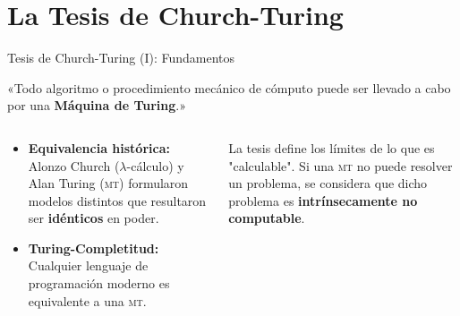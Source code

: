 \documentclass[aspectratio=1610, 12pt]{beamer}
\newcommand{\MT}{\textsc{mt}}
\begin{document}
\section{La Tesis de Church-Turing}
\begin{frame}[t]{Tesis de Church-Turing (I): Fundamentos}
\vspace{4pt}
\begin{center}
\begin{tcolorbox}[%
  enhanced, width=0.85\textwidth,
  colback=LightBg, colframe=NavyBlue,
  colbacktitle=NavyBlue, coltitle=white,
  fonttitle=\bfseries\normalsize,
  title={La Tesis Central},
  boxrule=1.3pt, arc=3pt,
  left=8pt, right=8pt, top=5pt, bottom=5pt]
  \small
  «Todo algoritmo o procedimiento mecánico de cómputo puede ser llevado a cabo por una \textbf{Máquina de Turing}.»
\end{tcolorbox}
\end{center}

\vspace{5pt}
\begin{columns}[T]
  \begin{column}{0.50\textwidth}
    \begin{itemize}\small\setlength{\itemsep}{5pt}
      \item \textbf{Equivalencia histórica:} Alonzo Church ($\lambda$-cálculo) y Alan Turing (\MT) formularon modelos distintos que resultaron ser \textbf{idénticos} en poder.
      \item \textbf{Turing-Completitud:} Cualquier lenguaje de programación moderno es equivalente a una \MT.
    \end{itemize}
  \end{column}

  \begin{column}{0.46\textwidth}
    \begin{defbox}
      \footnotesize
      La tesis define los límites de lo que es "calculable". Si una \MT{} no puede resolver un problema, se considera que dicho problema es \textbf{intrínsecamente no computable}.
    \end{defbox}
  \end{column}
\end{columns}
\end{frame}
\end{document}
